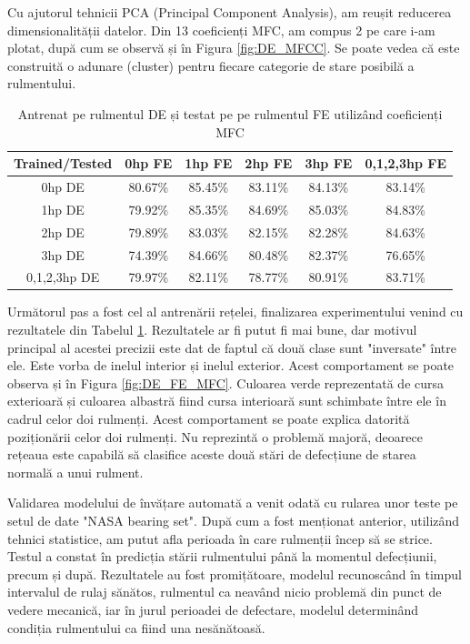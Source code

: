 \documentclass[a4paper,12pt]{report}
\begin{document}
    	Cu ajutorul tehnicii PCA (Principal Component Analysis), am reușit reducerea dimensionalității datelor. Din 13 coeficienți MFC, am compus 2 pe care i-am plotat, după cum se observă și în Figura \ref{fig:DE_MFCC}. Se poate vedea că este construită o adunare (cluster) pentru fiecare categorie de stare posibilă a rulmentului.
    	
    	\begin{table}[H]
    		\begin{tabular}{ |c|c|c|c|c|c| } 
    			\hline
    			Trained/Tested  & 0hp FE  & 1hp FE  & 2hp FE & 3hp FE & 0,1,2,3hp FE \\
    			\hline
    			0hp DE& 80.67\% 	& 85.45\%    & 83.11\%    & 84.13\%  & 83.14\% \\ 
    			\hline
    			1hp DE& 79.92\%    & 85.35\%    & 84.69\%    & 85.03\%  & 84.83\% \\ 
    			\hline
    			2hp DE& 79.89\%    & 83.03\%    & 82.15\%    & 82.28\%  & 84.63\% \\
    			\hline
    			3hp DE& 74.39\%    & 84.66\%    & 80.48\%    & 82.37\%  & 76.65\% \\
    			\hline
    			0,1,2,3hp DE& 79.97\% & 82.11\%    & 78.77\%    & 80.91\% & 83.71\% \\
    			\hline
    		\end{tabular}	
    		\caption{Antrenat pe rulmentul DE și testat pe pe rulmentul FE utilizând coeficienți MFC}
    		\label{tab:trainedDE_testedFE_differentLoads}
    	\end{table}
    	
    	Următorul pas a fost cel al antrenării rețelei, finalizarea experimentului venind cu rezultatele din Tabelul \ref{tab:trainedDE_testedFE_differentLoads}. Rezultatele ar fi putut fi mai bune, dar motivul principal al acestei precizii este dat de faptul că două clase sunt "inversate" între ele. Este vorba de inelul interior și inelul exterior. Acest comportament se poate observa și în Figura \ref{fig:DE_FE_MFC}. Culoarea verde reprezentată de cursa exterioară și culoarea albastră fiind cursa interioară sunt schimbate între ele în cadrul celor doi rulmenți. Acest comportament se poate explica datorită poziționării celor doi rulmenți. Nu reprezintă o problemă majoră, deoarece rețeaua este capabilă să clasifice aceste două stări de defecțiune de starea normală a unui rulment.
    	
    	Validarea modelului de învățare automată a venit odată cu rularea unor teste pe setul de date "NASA bearing set". După cum a fost menționat anterior, utilizând tehnici statistice, am putut afla perioada în care rulmenții încep să se strice. Testul a constat în predicția stării rulmentului până la momentul defecțiunii, precum și după. Rezultatele au fost promițătoare, modelul recunoscând în timpul intervalul de rulaj sănătos, rulmentul ca neavând nicio problemă din punct de vedere mecanică, iar în jurul perioadei de defectare, modelul determinând condiția rulmentului ca fiind una nesănătoasă.
 		
\end{document}
